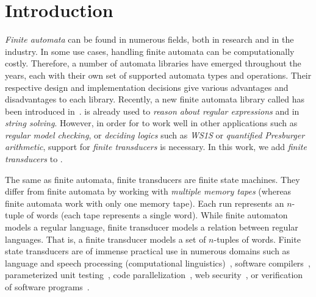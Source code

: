 
% 

\chapter{Introduction}

\emph{Finite automata} can be found in numerous fields, both in research and in the industry.
In some use cases, handling finite automata can be computationally costly.
Therefore, a number of automata libraries have emerged throughout the years, each with their own set of supported automata types and operations.
Their respective design and implementation decisions give various advantages and disadvantages to each library.
Recently, a new finite automata library called \mata has been introduced in~\cite{tacas24_mata_10.1007/978-3-031-57249-4_7}.
\mata is already used to \emph{reason about regular expressions} and in \emph{string solving}.
However, in order for \mata to work well in other applications such as \emph{regular model checking}, or \emph{deciding logics} such as \emph{WS1S} or \emph{quantified Presburger arithmetic}, support for \emph{finite transducers} is necessary.
In this work, we add \emph{finite transducers} to \mata.

The same as finite automata, finite transducers are finite state machines.
They differ from finite automata by working with \emph{multiple memory tapes} (whereas finite automata work with only one memory tape).
Each run represents an $n$-tuple of words (each tape represents a single word).
While finite automaton models a regular language, finite transducer models a relation between regular languages.
That is, a finite transducer models a set of $n$-tuples of words.
Finite state transducers are of immense practical use in numerous domains such as language and speech processing (computational linguistics)~\cite{DBLP:journals/coling/Mohri97}, software compilers~\cite{compilers}, parameterized unit testing~\cite{DBLP:conf/icst/VeanesHT10}, code parallelization~\cite{DBLP:journals/nle/Watson96}, web security~\cite{DBLP:conf/uss/HooimeijerLMSV11}, or verification of software programs~\cite{DBLP:books/ws/automata12}.

